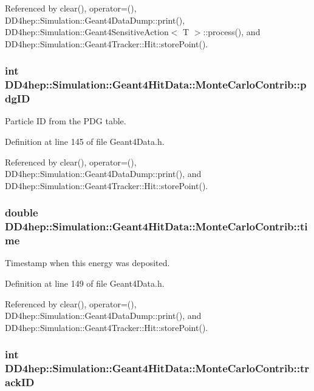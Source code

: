 Referenced by clear(), operator=(), DD4hep::Simulation::Geant4DataDump::print(), DD4hep::Simulation::Geant4SensitiveAction$<$ T $>$::process(), and DD4hep::Simulation::Geant4Tracker::Hit::storePoint().\hypertarget{class_d_d4hep_1_1_simulation_1_1_geant4_hit_data_1_1_monte_carlo_contrib_a7b755dfa6639f3cc02cd4696719d0580}{
\subsubsection[{pdgID}]{\setlength{\rightskip}{0pt plus 5cm}int {\bf DD4hep::Simulation::Geant4HitData::MonteCarloContrib::pdgID}}}
\label{class_d_d4hep_1_1_simulation_1_1_geant4_hit_data_1_1_monte_carlo_contrib_a7b755dfa6639f3cc02cd4696719d0580}


Particle ID from the PDG table. 

Definition at line 145 of file Geant4Data.h.

Referenced by clear(), operator=(), DD4hep::Simulation::Geant4DataDump::print(), and DD4hep::Simulation::Geant4Tracker::Hit::storePoint().\hypertarget{class_d_d4hep_1_1_simulation_1_1_geant4_hit_data_1_1_monte_carlo_contrib_a2d1cbbdb9da1af65acb58ef97fe10277}{
\subsubsection[{time}]{\setlength{\rightskip}{0pt plus 5cm}double {\bf DD4hep::Simulation::Geant4HitData::MonteCarloContrib::time}}}
\label{class_d_d4hep_1_1_simulation_1_1_geant4_hit_data_1_1_monte_carlo_contrib_a2d1cbbdb9da1af65acb58ef97fe10277}


Timestamp when this energy was deposited. 

Definition at line 149 of file Geant4Data.h.

Referenced by clear(), operator=(), DD4hep::Simulation::Geant4DataDump::print(), and DD4hep::Simulation::Geant4Tracker::Hit::storePoint().\hypertarget{class_d_d4hep_1_1_simulation_1_1_geant4_hit_data_1_1_monte_carlo_contrib_a80a8546851d931b3b39e690a3bc1b3d8}{
\subsubsection[{trackID}]{\setlength{\rightskip}{0pt plus 5cm}int {\bf DD4hep::Simulation::Geant4HitData::MonteCarloContrib::trackID}}}
\label{class_d_d4hep_1_1_simulation_1_1_geant4_hit_data_1_1_monte_carlo_contrib_a80a8546851d931b3b39e690a3bc1b3d8}


